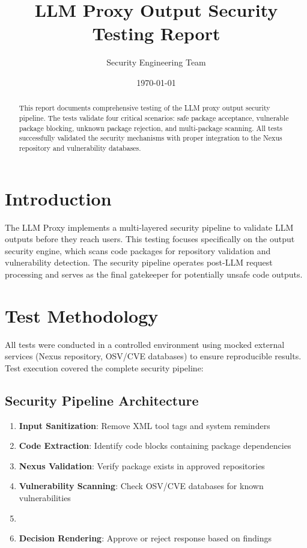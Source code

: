 \documentclass[11pt, a4paper]{article}
\title{LLM Proxy Output Security Testing Report}
\author{Security Engineering Team}
\date{\today}
\begin{document}
\maketitle

\begin{abstract}
This report documents comprehensive testing of the LLM proxy output security pipeline. The tests validate four critical scenarios: safe package acceptance, vulnerable package blocking, unknown package rejection, and multi-package scanning. All tests successfully validated the security mechanisms with proper integration to the Nexus repository and vulnerability databases.
\end{abstract}

\tableofcontents

\section{Introduction}
The LLM Proxy implements a multi-layered security pipeline to validate LLM outputs before they reach users. This testing focuses specifically on the output security engine, which scans code packages for repository validation and vulnerability detection. The security pipeline operates post-LLM request processing and serves as the final gatekeeper for potentially unsafe code outputs.

\section{Test Methodology}
All tests were conducted in a controlled environment using mocked external services (Nexus repository, OSV/CVE databases) to ensure reproducible results. Test execution covered the complete security pipeline:

\subsection{Security Pipeline Architecture}
\begin{enumerate}
    \item \textbf{Input Sanitization}: Remove XML tool tags and system reminders
    \item \textbf{Code Extraction}: Identify code blocks containing package dependencies
    \item \textbf{Nexus Validation}: Verify package exists in approved repositories
    \item \textbf{Vulnerability Scanning}: Check OSV/CVE databases for known vulnerabilities
    \item \item \textbf{Decision Rendering}: Approve or reject response based on findings
\end{enumerate}
\end{document}
